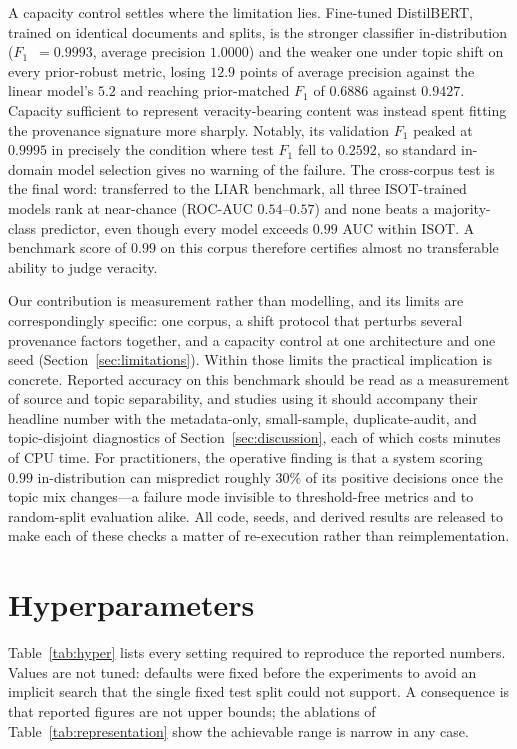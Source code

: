 \documentclass[conference]{IEEEtran}
\newcommand{\Fone}{$F_1$}
\begin{document}
A capacity control settles where the limitation lies. Fine-tuned DistilBERT,
trained on identical documents and splits, is the stronger classifier
in-distribution (\Fone{}~$=0.9993$, average precision $1.0000$) and the weaker
one under topic shift on every prior-robust metric, losing $12.9$ points of
average precision against the linear model's $5.2$ and reaching prior-matched
\Fone{} of $0.6886$ against $0.9427$. Capacity sufficient to represent
veracity-bearing content was instead spent fitting the provenance signature more
sharply. Notably, its validation \Fone{} peaked at $0.9995$ in precisely the
condition where test \Fone{} fell to $0.2592$, so standard in-domain model
selection gives no warning of the failure. The cross-corpus test is the final
word: transferred to the LIAR benchmark, all three ISOT-trained models rank at
near-chance (ROC-AUC $0.54$--$0.57$) and none beats a majority-class predictor,
even though every model exceeds $0.99$ AUC within ISOT. A benchmark score of
$0.99$ on this corpus therefore certifies almost no transferable ability to
judge veracity.

Our contribution is measurement rather than modelling, and its limits are
correspondingly specific: one corpus, a shift protocol that perturbs several
provenance factors together, and a capacity control at one architecture and one
seed (Section~\ref{sec:limitations}). Within those limits the practical
implication is concrete. Reported accuracy on this benchmark should be read as a measurement
of source and topic separability, and studies using it should accompany their
headline number with the metadata-only, small-sample, duplicate-audit, and
topic-disjoint diagnostics of Section~\ref{sec:discussion}, each of which costs
minutes of CPU time. For practitioners, the operative finding is that a system
scoring $0.99$ in-distribution can mispredict roughly $30\%$ of its positive
decisions once the topic mix changes---a failure mode invisible to
threshold-free metrics and to random-split evaluation alike. All code, seeds,
and derived results are released to make each of these checks a matter of
re-execution rather than reimplementation.

\appendices

\section{Hyperparameters}
\label{app:hyper}
Table~\ref{tab:hyper} lists every setting required to reproduce the reported
numbers. Values are not tuned: defaults were fixed before the experiments to
avoid an implicit search that the single fixed test split could not support. A
consequence is that reported figures are not upper bounds; the ablations of
Table~\ref{tab:representation} show the achievable range is narrow in any case.
\end{document}
